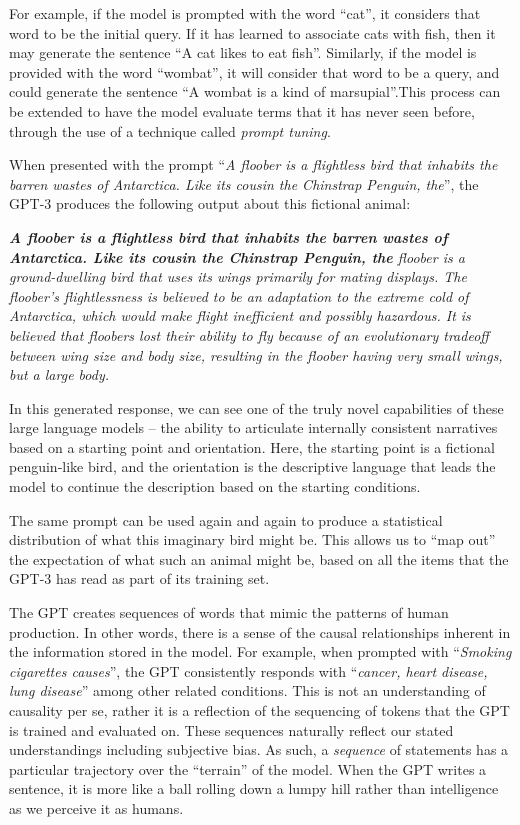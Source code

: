 \documentclass[11pt,dvipdfm]{article}
\begin{document}
For example, if the model is prompted with the word \enquote{cat}, it considers that word to be the initial query. If it has learned to associate cats with fish, then it may generate the sentence \enquote{A cat likes to eat fish}. Similarly, if the model is provided with the word \enquote{wombat}, it will consider that word to be a query, and could generate the sentence \enquote{A wombat is a kind of marsupial}.This process can be extended to have the model evaluate terms that it has never seen before, through the use of a technique called \textit{prompt tuning}. 

When presented with the prompt \enquote{\textit{A floober is a flightless bird that inhabits the barren wastes of Antarctica. Like its cousin the Chinstrap Penguin, the}}, the GPT-3 produces the following output about this fictional animal:

\begin{displayquote}
\textit{\textbf{A floober is a flightless bird that inhabits the barren wastes of Antarctica. Like its cousin the Chinstrap Penguin, the} floober is a ground-dwelling bird that uses its wings primarily for mating displays. The floober's flightlessness is believed to be an adaptation to the extreme cold of Antarctica, which would make flight inefficient and possibly hazardous. It is believed that floobers lost their ability to fly because of an evolutionary tradeoff between wing size and body size, resulting in the floober having very small wings, but a large body.}
\end{displayquote}

In this generated response, we can see one of the truly novel capabilities of these large language models -- the ability to articulate internally consistent narratives  based on a starting point and orientation. Here, the starting point is a fictional penguin-like bird, and the orientation is the descriptive language that leads the model to continue the description based on the starting conditions. 

The same prompt can be used again and again to produce a statistical distribution of what this imaginary bird might be. This allows us to \enquote{map out} the expectation of what such an animal might be, based on all the items that the GPT-3 has read as part of its training set.

The GPT creates sequences of words that mimic the patterns of human production. In other words, there is a sense of the causal relationships inherent in the information stored in the model. For example, when prompted with \enquote{\textit{Smoking cigarettes causes}}, the GPT consistently responds with \enquote{\textit{cancer, heart disease, lung disease}} among other related conditions. This is not an understanding of causality per se, rather it is a reflection of the sequencing of tokens that the GPT is trained and evaluated on. These sequences naturally reflect our stated understandings including subjective bias. As such, a \textit{sequence} of statements has a particular trajectory over the \enquote{terrain} of the model. When the GPT writes a sentence, it is more like a ball rolling down a lumpy hill rather than intelligence as we perceive it as humans. 
\end{document}
